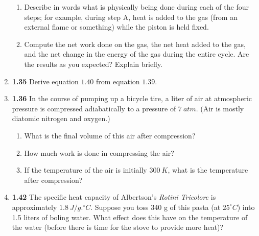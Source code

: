 \documentclass[fleqn]{article}
\begin{document}
\begin{enumerate}
\begin{enumerate}
      \item Describe in words what is physically being done during each of the four steps; for example, during step A, heat is added to the 
      gas (from an external flame or something) while the piston is held fixed.
    

      \item Compute the net work done on the gas, the net heat added to the gas, and the net change in the energy of the gas during the entire
      cycle. Are the results as you expected? Explain briefly.


    \end{enumerate}


    \item \textbf{1.35} Derive equation $1.40$ from equation $1.39$.
  

    \item \textbf{1.36} In the course of pumping up a bicycle tire, a liter of air at atmospheric pressure is compressed adiabatically 
    to a pressure of $7 ~ atm$. (Air is mostly diatomic nitrogen and oxygen.)
    \begin{enumerate}
      \item What is the final volume of this air after compression?


      \item How much work is done in compressing the air?

      
      \item If the temperature of the air is initially $300 ~ K$, what is the temperature after compression?


    \end{enumerate}


    \item \textbf{1.42} The specific heat capacity of Albertson's \emph{Rotini Tricolore} is approximately $1.8 ~ J/g.^{\circ}C$. Suppose 
    you toss 340 g of this pasta (at $25^{\circ}C$) into 1.5 liters of boling water. What effect does this have on the temperature of the
    water (before there is time for the stove to provide more heat)?


  \end{enumerate}
\end{document}
